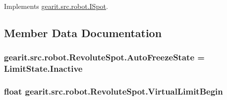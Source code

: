 Implements \hyperlink{interfacegearit_1_1src_1_1robot_1_1_i_spot_a280205c7b3f5eee03c1192324cb6cf12}{gearit.\+src.\+robot.\+I\+Spot}.



\subsection{Member Data Documentation}
\hypertarget{classgearit_1_1src_1_1robot_1_1_revolute_spot_aad3f7f2c138250daaa4479bf3dd0e74b}{
\subsubsection[{Auto\+Freeze\+State}]{ gearit.\+src.\+robot.\+Revolute\+Spot.\+Auto\+Freeze\+State = Limit\+State.\+Inactive}}\label{classgearit_1_1src_1_1robot_1_1_revolute_spot_aad3f7f2c138250daaa4479bf3dd0e74b}
\hypertarget{classgearit_1_1src_1_1robot_1_1_revolute_spot_a04645244f06d643f059fd8dd31cccdce}{
\subsubsection[{Virtual\+Limit\+Begin}]{\setlength{\rightskip}{0pt plus 5cm}float gearit.\+src.\+robot.\+Revolute\+Spot.\+Virtual\+Limit\+Begin}}\label{classgearit_1_1src_1_1robot_1_1_revolute_spot_a04645244f06d643f059fd8dd31cccdce}


